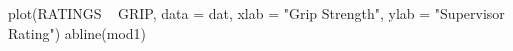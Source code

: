 \begin{Schunk}
\begin{Sinput}
 plot(RATINGS ~ GRIP, data = dat, xlab = "Grip Strength", ylab = "Supervisor Rating")
 abline(mod1)
\end{Sinput}
\end{Schunk}
